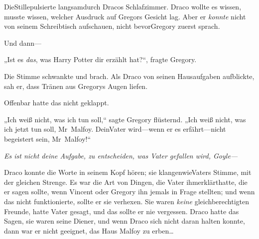 DieStillepulsierte langsamdurch Dracos Schlafzimmer. Draco wollte es wissen, musste wissen, welcher Ausdruck auf Gregors Gesicht lag. Aber er \emph{konnte} nicht von seinem Schreibtisch aufschauen, nicht bevorGregory zuerst sprach.

Und dann—

„Ist es \emph{das}, was Harry Potter dir erzählt hat?“, fragte Gregory.

Die Stimme schwankte und brach. Als Draco von seinen Hausaufgaben aufblickte, sah er, dass Tränen aus Gregorys Augen liefen.

Offenbar hatte das nicht geklappt.

„Ich weiß nicht, was ich tun soll,“ sagte Gregory flüsternd. „Ich weiß nicht, was ich jetzt tun soll, Mr~Malfoy. DeinVater wird—wenn er es erfährt—nicht begeistert sein, Mr~Malfoy!“

\emph{Es ist nicht \emph{deine} Aufgabe, zu entscheiden, was Vater gefallen wird, Goyle—}

Draco konnte die Worte in seinem Kopf hören; sie klangenwieVaters Stimme, mit der gleichen Strenge. Es war die Art von Dingen, die Vater ihmerklärthatte, die er sagen sollte, wenn Vincent oder Gregory ihn jemals in Frage stellten; und wenn das nicht funktionierte, sollte er sie verhexen. Sie waren \emph{keine} gleichberechtigten Freunde, hatte Vater gesagt, und das sollte er nie vergessen. Draco hatte das Sagen, sie waren seine Diener, und wenn Draco sich nicht daran halten konnte, dann war er nicht geeignet, das Haus Malfoy zu erben…


